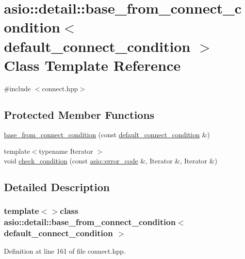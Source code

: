\hypertarget{classasio_1_1detail_1_1base__from__connect__condition_3_01default__connect__condition_01_4}{}\section{asio\+:\+:detail\+:\+:base\+\_\+from\+\_\+connect\+\_\+condition$<$ default\+\_\+connect\+\_\+condition $>$ Class Template Reference}
\label{classasio_1_1detail_1_1base__from__connect__condition_3_01default__connect__condition_01_4}


{\ttfamily \#include $<$connect.\+hpp$>$}

\subsection*{Protected Member Functions}
\begin{DoxyCompactItemize}
\item 
\hyperlink{classasio_1_1detail_1_1base__from__connect__condition_3_01default__connect__condition_01_4_a41b517c5dcfb7003fa32dcf1037c409d}{base\+\_\+from\+\_\+connect\+\_\+condition} (const \hyperlink{structasio_1_1detail_1_1default__connect__condition}{default\+\_\+connect\+\_\+condition} \&)
\item 
{\footnotesize template$<$typename Iterator $>$ }\\void \hyperlink{classasio_1_1detail_1_1base__from__connect__condition_3_01default__connect__condition_01_4_afb5523149b13c2724dda770b525dd01b}{check\+\_\+condition} (const \hyperlink{classasio_1_1error__code}{asio\+::error\+\_\+code} \&, Iterator \&, Iterator \&)
\end{DoxyCompactItemize}


\subsection{Detailed Description}
\subsubsection*{template$<$$>$class asio\+::detail\+::base\+\_\+from\+\_\+connect\+\_\+condition$<$ default\+\_\+connect\+\_\+condition $>$}



Definition at line 161 of file connect.\+hpp.



